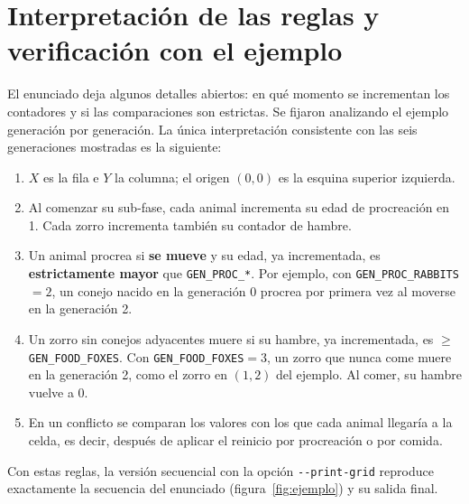 \documentclass[11pt,a4paper]{article}
\begin{document}
\section{Interpretación de las reglas y verificación con el ejemplo}
El enunciado deja algunos detalles abiertos: en qué momento se incrementan los contadores y si las
comparaciones son estrictas. Se fijaron analizando el ejemplo generación por generación. La única
interpretación consistente con las seis generaciones mostradas es la siguiente:

\begin{enumerate}[nosep]
  \item $X$ es la fila e $Y$ la columna; el origen $(0,0)$ es la esquina superior izquierda.
  \item Al comenzar su sub-fase, cada animal incrementa su edad de procreación en 1. Cada zorro incrementa
    también su contador de hambre.
  \item Un animal procrea si \textbf{se mueve} y su edad, ya incrementada, es \textbf{estrictamente mayor}
    que \texttt{GEN\_PROC\_*}. Por ejemplo, con \texttt{GEN\_PROC\_RABBITS}$=2$, un conejo nacido en la
    generación 0 procrea por primera vez al moverse en la generación 2.
  \item Un zorro sin conejos adyacentes muere si su hambre, ya incrementada, es
    $\geq$ \texttt{GEN\_FOOD\_FOXES}. Con \texttt{GEN\_FOOD\_FOXES}$=3$, un zorro que nunca come muere en
    la generación 2, como el zorro en $(1,2)$ del ejemplo. Al comer, su hambre vuelve a 0.
  \item En un conflicto se comparan los valores con los que cada animal llegaría a la celda, es decir,
    después de aplicar el reinicio por procreación o por comida.
\end{enumerate}

Con estas reglas, la versión secuencial con la opción \texttt{-{}-print-grid} reproduce exactamente la
secuencia del enunciado (figura~\ref{fig:ejemplo}) y su salida final.
\end{document}
